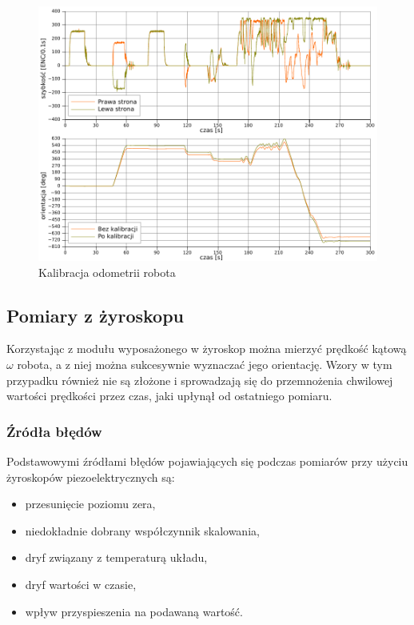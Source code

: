 \begin{figure}[ht!]
\centering
\includegraphics[width=\textwidth]{../../Common/pomiary/odom_calib}
\caption{Kalibracja odometrii robota}
\label{fig:odom_calib}
\end{figure}

\subsection{Pomiary z żyroskopu}

Korzystając z modułu wyposażonego w żyroskop można mierzyć prędkość kątową
$\omega$ robota, a z niej można sukcesywnie wyznaczać jego orientację. Wzory w
tym przypadku również nie są złożone i sprowadzają się do przemnożenia chwilowej
wartości prędkości przez czas, jaki upłynął od ostatniego pomiaru. 

\subsubsection{Źródła błędów}

Podstawowymi źródłami błędów pojawiających się podczas pomiarów przy użyciu
żyroskopów piezoelektrycznych są:

\begin{itemize}
  \item przesunięcie poziomu zera,
  \item niedokładnie dobrany współczynnik skalowania,
  \item dryf związany z temperaturą układu,
  \item dryf wartości w czasie,
  \item wpływ przyspieszenia na podawaną wartość.
\end{itemize}

